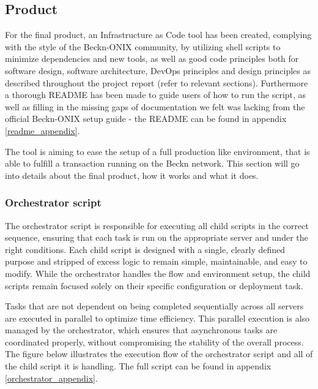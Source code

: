 \subsection{Product}
\label{product}
For the final product, an Infrastructure as Code tool has been created, complying with the style of the Beckn-ONIX community, by utilizing shell scripts to minimize dependencies and new tools, as well as good code principles both for software design, software architecture, DevOps principles and design principles as described throughout the project report (refer to relevant sections). Furthermore a thorough README has been made to guide users of how to run the script, as well as filling in the missing gaps of documentation we felt was lacking from the official Beckn-ONIX setup guide - the README can be found in appendix \ref{readme_appendix}. 

The tool is aiming to ease the setup of a full production like environment, that is able to fulfill a transaction running on the Beckn network. This section will go into details about the final product, how it works and what it does.

\subsubsection{Orchestrator script}
\label{product_orchestrator}
The orchestrator script is responsible for executing all child scripts in the correct sequence, ensuring that each task is run on the appropriate server and under the right conditions. Each child script is designed with a single, clearly defined purpose and stripped of excess logic to remain simple, maintainable, and easy to modify. While the orchestrator handles the flow and environment setup, the child scripts remain focused solely on their specific configuration or deployment task.

Tasks that are not dependent on being completed sequentially across all servers are executed in parallel to optimize time efficiency. This parallel execution is also managed by the orchestrator, which ensures that asynchronous tasks are coordinated properly, without compromising the stability of the overall process. The figure below illustrates the execution flow of the orchestrator script and all of the child script it is handling. The full script can be found in appendix \ref{orchestrator_appendix}.\newpage

